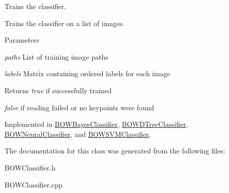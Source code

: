 Trains the classifier. 

Trains the classifier on a list of images.


\begin{DoxyParams}{Parameters}
\item[{\em paths}]List of training image paths \item[{\em labels}]Matrix containing ordered labels for each image \end{DoxyParams}
\begin{DoxyReturn}{Returns}
{\itshape true\/} if successfully trained\par
 {\itshape false\/} if reading failed or no keypoints were found 
\end{DoxyReturn}


Implemented in \hyperlink{classBOWBayesClassifier_a66e43076ec168747b903705ea2448939}{BOWBayesClassifier}, \hyperlink{classBOWDTreeClassifier_ade9a3a1bf1ada1a2fdeefa96eb67edd0}{BOWDTreeClassifier}, \hyperlink{classBOWNeuralClassifier_a8e29bc1d8b2fe3d3b362a5f224d5a095}{BOWNeuralClassifier}, and \hyperlink{classBOWSVMClassifier_a95f08ba073d32d733aa79ae52113c147}{BOWSVMClassifier}.



The documentation for this class was generated from the following files:\begin{DoxyCompactItemize}
\item 
BOWClassifier.h\item 
BOWClassifier.cpp\end{DoxyCompactItemize}
